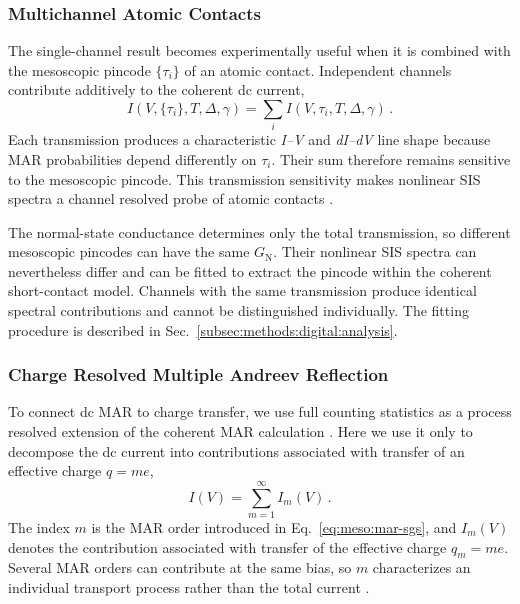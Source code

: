         \subsubsection*{Multichannel Atomic Contacts}

            The single-channel result becomes experimentally useful when it is combined with the mesoscopic pincode $\{\tau_i\}$ of an atomic contact. Independent channels contribute additively to the coherent dc current,
            \begin{equation}
                I(V,\{\tau_i\},T,\Delta,\gamma)
                =
                \sum_i I(V,\tau_i,T,\Delta,\gamma)\,.
            \end{equation}
            Each transmission produces a characteristic \textit{I--V} and \textit{dI--dV} line shape because MAR probabilities depend differently on $\tau_i$. Their sum therefore remains sensitive to the mesoscopic pincode. This transmission sensitivity makes nonlinear SIS spectra a channel resolved probe of atomic contacts \cite{cuevas_hamiltonian_1996,scheer_conduction_1997}.

            The normal-state conductance determines only the total transmission, so different mesoscopic pincodes can have the same $G_\mathrm{N}$. Their nonlinear SIS spectra can nevertheless differ and can be fitted to extract the pincode within the coherent short-contact model. Channels with the same transmission produce identical spectral contributions and cannot be distinguished individually. The fitting procedure is described in Sec.~\ref{subsec:methods:digital:analysis}.

        \subsubsection*{Charge Resolved Multiple Andreev Reflection}

            To connect dc MAR to charge transfer, we use full counting statistics as a process resolved extension of the coherent MAR calculation \cite{levitov_charge_1993,levitov_electron_1996,cuevas_full_2003}. Here we use it only to decompose the dc current into contributions associated with transfer of an effective charge $q=me$,
            \begin{equation}
                I(V)=\sum_{m=1}^{\infty} I_m(V)\,.
                \label{eq:meso:fcs-decomposition}
            \end{equation}
            The index $m$ is the MAR order introduced in Eq.~\eqref{eq:meso:mar-sgs}, and $I_m(V)$ denotes the contribution associated with transfer of the effective charge $q_m=me$. Several MAR orders can contribute at the same bias, so $m$ characterizes an individual transport process rather than the total current \cite{cuevas_full_2003}.


